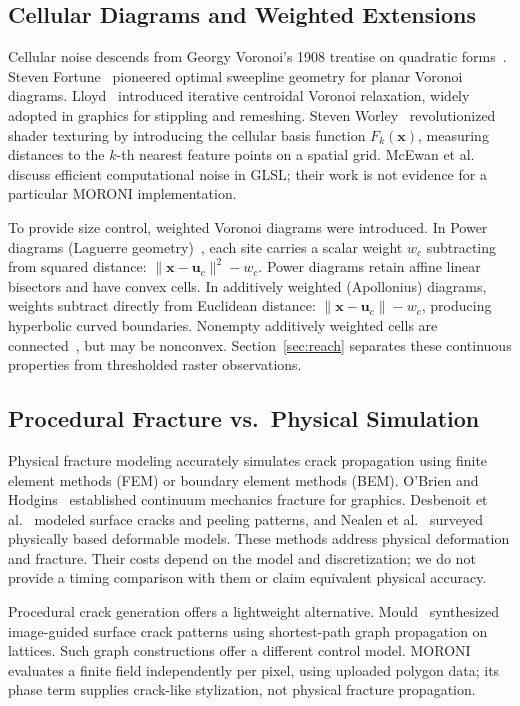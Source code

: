 \documentclass[sigconf,nonacm]{acmart}
\begin{document}
\subsection{Cellular Diagrams and Weighted Extensions}
Cellular noise descends from Georgy Voronoi's 1908 treatise on quadratic
forms~\cite{voronoi1908}. Steven Fortune~\cite{fortune1987} pioneered optimal
sweepline geometry for planar Voronoi diagrams. Lloyd~\cite{lloyd1982} introduced
iterative centroidal Voronoi relaxation, widely adopted in graphics for stippling
and remeshing. Steven Worley~\cite{worley1996} revolutionized shader texturing by
introducing the cellular basis function $F_k(\mathbf{x})$, measuring distances
to the $k$-th nearest feature points on a spatial grid. McEwan et al.~\cite{mcewan2012noise} discuss efficient computational noise
in GLSL; their work is not evidence for a particular MORONI implementation.

To provide size control, weighted Voronoi diagrams were introduced. In Power
diagrams (Laguerre geometry)~\cite{aurenhammer1987power}, each site carries a
scalar weight $w_c$ subtracting from squared distance:
$\lVert\mathbf{x}-\mathbf{u}_c\rVert^2 - w_c$. Power diagrams retain affine
linear bisectors and have convex cells. In additively weighted (Apollonius)
diagrams, weights subtract directly from Euclidean distance:
$\lVert\mathbf{x}-\mathbf{u}_c\rVert - w_c$, producing hyperbolic curved
boundaries. Nonempty additively weighted cells are connected~\cite{cgal_apollonius},
but may be nonconvex. Section~\ref{sec:reach} separates these continuous
properties from thresholded raster observations.

\subsection{Procedural Fracture vs.\ Physical Simulation}
Physical fracture modeling accurately simulates crack propagation using finite
element methods (FEM) or boundary element methods (BEM). O'Brien and
Hodgins~\cite{obrien1999fracture} established continuum mechanics fracture for
graphics. Desbenoit et al.~\cite{desbenoit2005cracks} modeled surface cracks and
peeling patterns, and Nealen et al.~\cite{nealen2006survey} surveyed physically
based deformable models. These methods address physical deformation and fracture. Their costs depend
on the model and discretization; we do not provide a timing comparison with
them or claim equivalent physical accuracy.

Procedural crack generation offers a lightweight alternative. Mould~\cite{mould2005fracture}
synthesized image-guided surface crack patterns using shortest-path graph propagation
on lattices. Such graph constructions offer a different control model. MORONI evaluates
a finite field independently per pixel, using uploaded polygon data; its
phase term supplies crack-like stylization, not physical fracture propagation.
\end{document}
